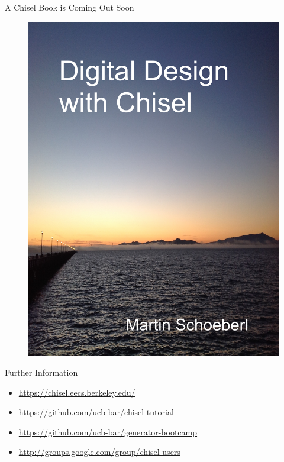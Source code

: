 \documentclass[xcolor=pdflatex,dvipsnames,table]{beamer}
\begin{document}
\begin{frame}[fragile]{A Chisel Book is Coming Out Soon}
\begin{figure}
    \centering
    \includegraphics[scale=0.1]{../chisel-cover}
\end{figure}
\end{frame}

\begin{frame}[fragile]{Further Information}
\begin{itemize}
\item \url{https://chisel.eecs.berkeley.edu/}
\item \url{https://github.com/ucb-bar/chisel-tutorial}
\item \url{https://github.com/ucb-bar/generator-bootcamp}
\item \url{http://groups.google.com/group/chisel-users}
\end{itemize}
\end{frame}
\end{document}
